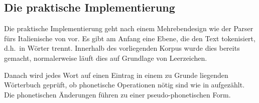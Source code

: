 \documentclass[12pt,headsepline,a4paper]{scrartcl}
\begin{document}

%
\subsection{Die praktische Implementierung}
\label{sec:prac_imp}
Die praktische Implementierung geht nach einem Mehrebendesign wie der Parser fürs Italienische von \textcite{iaco2011} vor. Es gibt am Anfang eine Ebene, die den Text tokenisiert, d.h.\ in Wörter trennt. Innerhalb des vorliegenden Korpus wurde dies bereits gemacht, normalerweise läuft dies auf Grundlage von Leerzeichen.

Danach wird jedes Wort auf einen Eintrag in einem zu Grunde liegenden Wörterbuch geprüft, ob phonetische Operationen nötig sind wie in  aufgezählt. 
Die phonetischen Änderungen führen zu einer pseudo-phonetischen Form.
\end{document}
